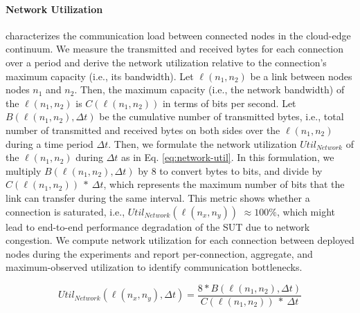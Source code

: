 \documentclass[runningheads]{llncs}
\begin{document}
\paragraph{Network Utilization} characterizes the communication load between connected nodes in the cloud-edge continuum.
We measure the transmitted and received bytes for each connection over a period and derive the network utilization relative to the connection's maximum capacity (i.e., its bandwidth).
Let $\ell(n_1,n_2)$ be a link between nodes nodes $n_1$ and $n_2$.
Then, the maximum capacity (i.e., the network bandwidth) of the $\ell(n_1,n_2)$ is $C({\ell(n_1,n_2)})$ in terms of bits per second.
Let $B(\ell(n_1,n_2),\Delta t)$ be the cumulative number of transmitted bytes, i.e., total number of transmitted and received bytes on both sides over the $\ell(n_1,n_2)$ during a time period $\Delta t$.
Then, we formulate the network utilization $Util_{Network}$ of the $\ell(n_1,n_2)$ during $\Delta t$ as in Eq. \ref{eq:network-util}.
In this formulation, we multiply $B(\ell(n_1,n_2),\Delta t)$ by 8 to convert bytes to bits, and divide by $C({\ell(n_1,n_2)})~*~\Delta t$, which represents the maximum number of bits that the link can transfer during the same interval.
This metric shows whether a connection is saturated, i.e., $Util_{Network}(\ell(n_x,n_y))$ $\approx 100\%$, which might lead to end-to-end performance degradation of the SUT due to network congestion.
We compute network utilization for each connection between deployed nodes during the experiments and report per-connection, aggregate, and maximum-observed utilization to identify communication bottlenecks.

\begin{equation}\label{eq:network-util}
Util_{Network}(\ell(n_x,n_y),\Delta t) = \frac{8 * B(\ell(n_1,n_2),\Delta t)}{C({\ell(n_1,n_2)})~*~\Delta t}
\end{equation}
\end{document}
